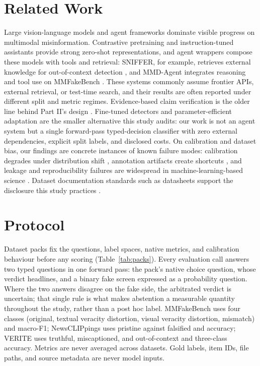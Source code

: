 \documentclass[conference]{IEEEtran}
\begin{document}
\section{Related Work}

Large vision-language models and agent frameworks dominate visible progress on multimodal misinformation. Contrastive pretraining \cite{Radford2021LearningTransferable} and instruction-tuned assistants provide strong zero-shot representations, and agent wrappers compose these models with tools and retrieval: SNIFFER, for example, retrieves external knowledge for out-of-context detection \cite{Qi2024SnifferMultimodal}, and MMD-Agent integrates reasoning and tool use on MMFakeBench \cite{Liu2024MmfakebenchMixedsource}. These systems commonly assume frontier APIs, external retrieval, or test-time search, and their results are often reported under different split and metric regimes. Evidence-based claim verification is the older line behind Part II's design \cite{Thorne2018FeverLargescale}. Fine-tuned detectors and parameter-efficient adaptation \cite{Hu2021LoraLowrank} are the smaller alternative this study audits: our work is not an agent system but a single forward-pass typed-decision classifier with zero external dependencies, explicit split labels, and disclosed costs. On calibration and dataset bias, our findings are concrete instances of known failure modes: calibration degrades under distribution shift \cite{Guo2017CalibrationModern,Ovadia2019CanYou,Minderer2021RevisitingCalibration}, annotation artifacts create shortcuts \cite{Gururangan2018AnnotationArtifacts}, and leakage and reproducibility failures are widespread in machine-learning-based science \cite{Kapoor2023LeakageReproducibility,Pineau2020ImprovingReproducibility}. Dataset documentation standards such as datasheets support the disclosure this study practices \cite{Gebru2018DatasheetsDatasets}.

\section{Protocol}

Dataset packs fix the questions, label spaces, native metrics, and calibration behaviour before any scoring (Table~\ref{tab:packs}). Every evaluation call answers two typed questions in one forward pass: the pack's native choice question, whose verdict headlines, and a binary fake screen expressed as a probability question. Where the two answers disagree on the fake side, the arbitrated verdict is uncertain; that single rule is what makes abstention a measurable quantity throughout the study, rather than a post hoc label. MMFakeBench uses four classes (original, textual veracity distortion, visual veracity distortion, mismatch) and macro-F1; NewsCLIPpings uses pristine against falsified and accuracy; VERITE uses truthful, miscaptioned, and out-of-context and three-class accuracy. Metrics are never averaged across datasets. Gold labels, item IDs, file paths, and source metadata are never model inputs.
\end{document}
